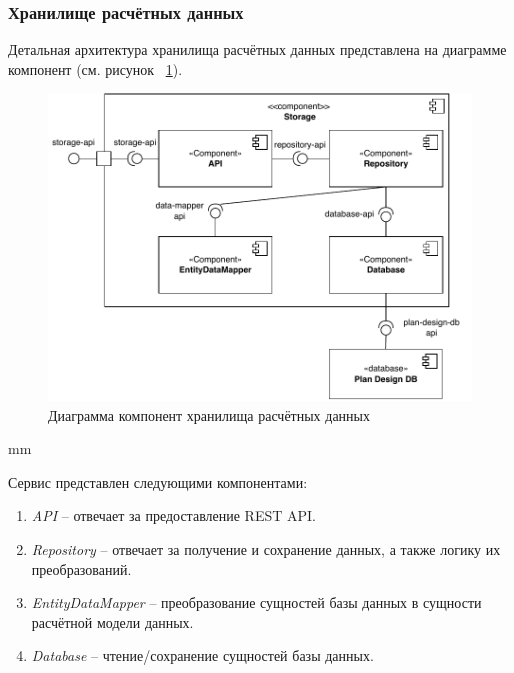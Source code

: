 \subsubsection{{Хранилище расчётных данных}}

Детальная архитектура хранилища расчётных данных представлена на диаграмме компонент
(см. рисунок \ \ref{pic:architecture__storage-component}).

\begin{figure}[H]
	\includegraphics[width=\textwidth]{architecture/pictures/storage/component_common}
	\caption{Диаграмма компонент хранилища расчётных данных}
	\label{pic:architecture__storage-component}
\end{figure}
 mm

Сервис представлен следующими компонентами:
\begin{enumerate}
	\item {
		\textit{API} -- отвечает за предоставление REST API.
	}
	\item {
		\textit{Repository} -- отвечает за получение и сохранение данных, а также логику их преобразований.
	}
	\item {
		\textit{EntityDataMapper} -- преобразование сущностей базы данных в сущности расчётной модели данных.
	}
	\item {
		\textit{Database} -- чтение/сохранение сущностей базы данных.
	}
\end{enumerate}